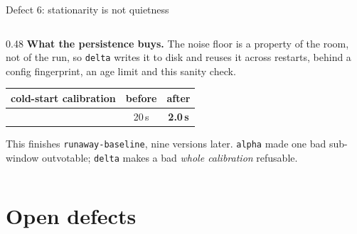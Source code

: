\documentclass[aspectratio=169]{beamer}
\begin{document}
\begin{frame}{Defect 6: stationarity is not quietness}
\begin{columns}[T]
\begin{column}{0.48\textwidth}
      \vspace{2.5mm}
      \textbf{What the persistence buys.} The noise floor is a property of the
      room, not of the run, so \texttt{delta} writes it to disk and reuses it
      across restarts, behind a config fingerprint, an age limit and this sanity
      check.

      \vspace{1mm}
      \centering
      {\footnotesize
      \begin{tabular}{@{}lcc@{}}
        \toprule
        cold-start calibration & before & \textbf{after} \\
        \midrule
        & 20\,s & \textbf{2.0\,s} \\
        \bottomrule
      \end{tabular}}

      \vspace{1.5mm}
      \raggedright
      {\scriptsize This finishes \texttt{runaway-baseline}, nine versions later.
      \texttt{alpha} made one bad sub-window outvotable; \texttt{delta} makes a
      bad \emph{whole calibration} refusable.}
    \end{column}
  \end{columns}
\end{frame}

\section{Open defects}
\end{document}
